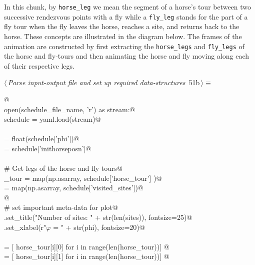 \documentclass[11.5pt]{report}
\begin{document}
\vspace{-0.8cm} \newchunk In this chunk, by \verb|horse_leg| we mean the segment of a horse's 
tour between two successive rendezvous points with a fly while a \verb|fly_leg| stands for 
the part of a fly tour when the fly leaves the horse, reaches a site, and returns back to the horse. These
concepts are illustrated in the diagram below. The frames of the animation are constructed by first
extracting the \verb|horse_legs| and \verb|fly_legs| of the horse and fly-tours and then 
animating the horse and fly moving along each of their respective legs. 


\begin{flushleft} \small\label{scrap65}\raggedright\small
{} $\langle\,${\itshape Parse input-output file and set up required data-structures}\nobreak\ {\footnotesize {51b}}$\,\rangle\equiv$
\vspace{-1ex}
\begin{list}{}{} \item
\mbox{}\verb@   @\\
\mbox{}\verb@with open(schedule_file_name, 'r') as stream:@\\
\mbox{}\verb@      schedule = yaml.load(stream)@\\
\mbox{}\verb@@\\
\mbox{}\verb@phi           = float(schedule['phi'])@\\
\mbox{}\verb@inithorseposn = schedule['inithorseposn']@\\
\mbox{}\verb@@\\
\mbox{}\verb@# Get legs of the horse and fly tours@\\
\mbox{}\verb@horse_tour  = map(np.asarray, schedule['horse_tour']   )@\\
\mbox{}\verb@sites       = map(np.asarray, schedule['visited_sites'])@\\
\mbox{}\verb@           @\\
\mbox{}\verb@# set important meta-data for plot@\\
\mbox{}\verb@ax.set_title("Number of sites: " + str(len(sites)), fontsize=25)@\\
\mbox{}\verb@ax.set_xlabel(r"$\varphi$ = " + str(phi), fontsize=20)@\\
\mbox{}\verb@@\\
\mbox{}\verb@xhs = [ horse_tour[i][0] for i in range(len(horse_tour))]    @\\
\mbox{}\verb@yhs = [ horse_tour[i][1] for i in range(len(horse_tour))]    @\\

\end{list}
\end{flushleft}
\end{document}
